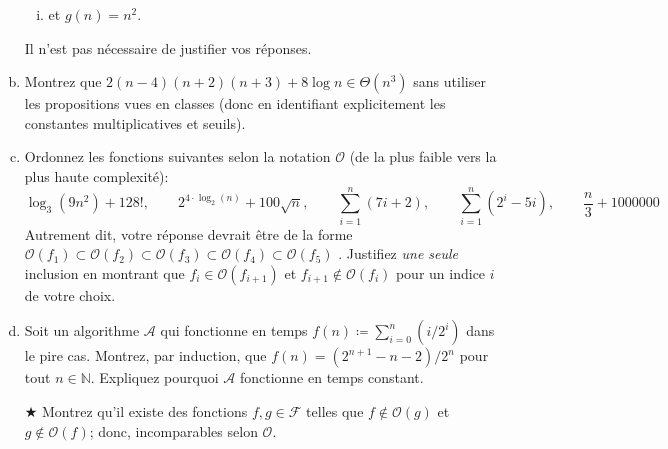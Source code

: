 \documentclass{article}
\newcommand{\avance}{{\large$\bigstar$}}         %
\newcommand{\avancepts}{{\scriptsize$\bigstar$}} %
\newcommand{\A}{\mathcal{A}}                     %
\renewcommand{\O}{\mathcal{O}}                   %
\newcommand{\F}{\mathcal{F}}                     %
\newcommand{\defeq}{\coloneqq}                   %
\newcommand{\N}{\mathbb{N}}                      %
\begin{document}
\begin{question}
\begin{enumerate}[(a)]
\begin{enumerate}[(i)]
    \item {} et $g(n)
      = n^2$.

    \end{enumerate}
    \bigskip
    Il n'est pas nécessaire de justifier vos réponses.

  \item Montrez  que $2(n-4)(n+2)(n+3) + 8
    \log n \in \Theta(n^3)$ sans utiliser les propositions vues en
    classes (donc en identifiant explicitement les constantes
    multiplicatives et seuils).

  \item Ordonnez  les fonctions suivantes
    selon la notation $\O$ (de la plus faible vers la plus haute
    complexité):
    \[
    \log_3 (9n^2) + 128!,\qquad
    2^{4 \cdot \log_2(n)} + 100\sqrt{n},\qquad
    \sum_{i=1}^{n} (7i + 2),\qquad
    \sum_{i=1}^n (2^i - 5i),\qquad
    \frac{n}{3} + 1000000
    \]
    Autrement dit, votre réponse devrait être de la forme \og $\O(f_1)
    \subset \O(f_2) \subset \O(f_3) \subset \O(f_4) \subset \O(f_5)$
    \fg. Justifiez \emph{une seule} inclusion en montrant que $f_i \in
    \O(f_{i+1})$ et $f_{i+1} \not\in \O(f_i)$ pour un indice $i$ de
    votre choix.
    
  \item Soit  un algorithme $\A$ qui
    fonctionne en temps $f(n) \defeq \sum_{i=0}^n (i / 2^i)$ dans le
    pire cas. Montrez, par induction, que $\displaystyle f(n) =
    (2^{n+1} - n - 2) / 2^n$ pour tout $n \in \N$. Expliquez pourquoi
    $\A$ fonctionne en temps constant.

    \vspace*{75pt}

  \item[\avance{}] Montrez \marginpar{\avancepts{} \addbonus{2.5}}
    qu'il existe des fonctions $f, g \in \F$ telles que $f \not\in
    \O(g)$ et $g \not\in \O(f)$; donc, incomparables selon $\O$.

  \end{enumerate}
\end{question}
\end{document}
